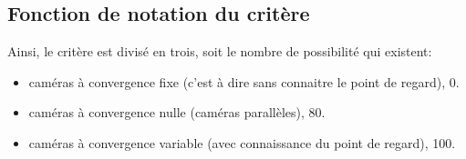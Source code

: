 	\subsection{Fonction de notation du critère}
	\par Ainsi, le critère est divisé en trois, soit le nombre de possibilité qui existent:
	\begin{itemize}
		\item caméras à convergence fixe (c'est à dire sans connaitre le point de regard), 0.
		\item caméras à convergence nulle (caméras parallèles), 80.
		\item caméras à convergence variable (avec connaissance du point de regard), 100.
	\end{itemize}